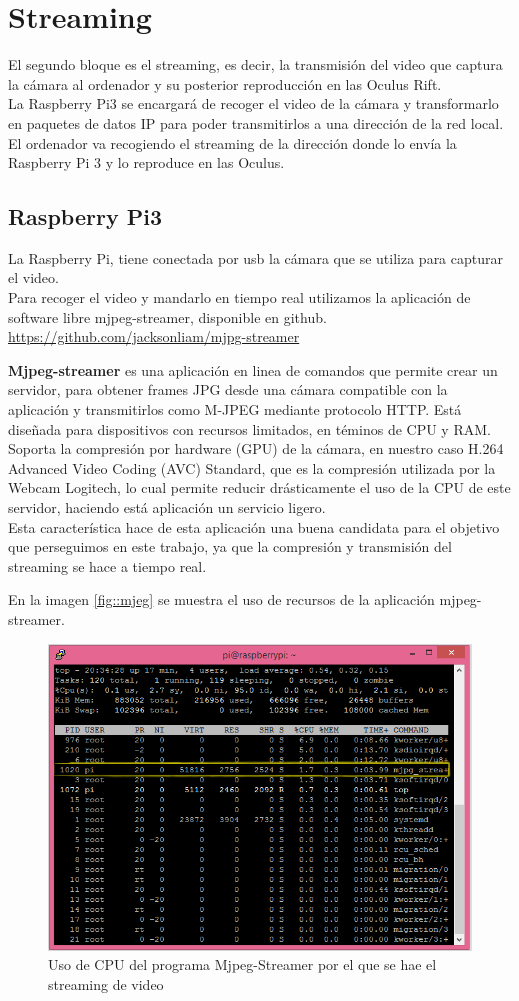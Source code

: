 \documentclass[twoside, 11pt]{epstfg}
\begin{document}
\section{Streaming}
El segundo bloque es el streaming, es decir, la transmisión del video que captura la cámara al ordenador y su posterior reproducción en las Oculus Rift.\\
La Raspberry Pi3 se encargará de recoger el video de la cámara y transformarlo en paquetes de datos IP para poder transmitirlos a una dirección de la red local.\\El ordenador va recogiendo el streaming de la dirección donde lo envía la Raspberry Pi 3 y lo reproduce en las Oculus.

\subsection{Raspberry Pi3}
La Raspberry Pi, tiene conectada por usb la cámara que se utiliza para capturar el video.\\
Para recoger el video y mandarlo en tiempo real utilizamos la aplicación de software libre mjpeg-streamer, disponible en github. \url{https://github.com/jacksonliam/mjpg-streamer}

\textbf{Mjpeg-streamer} es una aplicación en linea de comandos que permite crear un servidor, para obtener frames JPG desde una cámara compatible con la aplicación y transmitirlos como M-JPEG mediante protocolo HTTP. Está diseñada para dispositivos con recursos limitados, en téminos de CPU y RAM.\\
Soporta la compresión por hardware (GPU) de la cámara, en nuestro caso H.264 Advanced Video Coding (AVC) Standard, que es la compresión utilizada por la Webcam Logitech, lo cual permite reducir drásticamente el uso de la CPU de este servidor, haciendo está aplicación un servicio ligero.\\
Esta característica hace de esta aplicación una buena candidata para el objetivo que perseguimos en este trabajo, ya que la compresión y transmisión del streaming se hace a tiempo real.

En la imagen \ref{fig::mjeg} se muestra el uso de recursos de la aplicación mjpeg-streamer.


\begin{figure}[h!]
	\centerline{
		\mbox{\includegraphics[width=.80\textwidth]{images/UsoCPUMjpeg.png}}
	}
	\caption{Uso de CPU del programa Mjpeg-Streamer por el que se hae el streaming de video}
	\label{mjpeg}
\end{figure}
\end{document}
